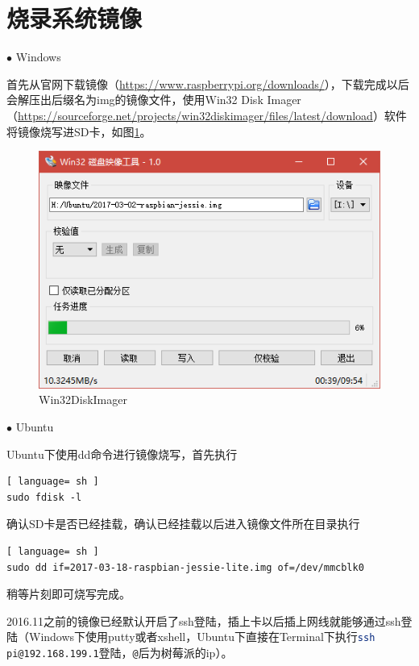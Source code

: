 	\section{烧录系统镜像}
		\par $\bullet$ Windows
		\par 首先从官网下载镜像（\href{https://www.raspberrypi.org/downloads/}{https://www.raspberrypi.org/downloads/}），下载完成以后会解压出后缀名为img的镜像文件，使用Win32 Disk Imager（\href{https://sourceforge.net/projects/win32diskimager/files/latest/download}{https://sourceforge.net/projects/win32diskimager/files/latest/download}）软件将镜像烧写进SD卡，如图\ref{fig:win32diskimager}。
		\begin{figure}[htp]
			\centering
			\includegraphics[width=13cm]{figures/win32diskimager.png}
			\caption{Win32DiskImager}
			\label{fig:win32diskimager}
		\end{figure}
		\par $\bullet$ Ubuntu
		\par Ubuntu下使用dd命令进行镜像烧写，首先执行
		\begin{lstlisting}[ language= sh ]
sudo fdisk -l
		\end{lstlisting}
		\par 确认SD卡是否已经挂载，确认已经挂载以后进入镜像文件所在目录执行
		\begin{lstlisting}[ language= sh ]
sudo dd if=2017-03-18-raspbian-jessie-lite.img of=/dev/mmcblk0
		\end{lstlisting}
		\par 稍等片刻即可烧写完成。
		\par 2016.11之前的镜像已经默认开启了ssh登陆，插上卡以后插上网线就能够通过ssh登陆（Windows下使用putty或者xshell，Ubuntu下直接在Terminal下执行\lstinline[language=sh]{ssh pi@192.168.199.1}登陆，\lstinline[language=sh]{@}后为树莓派的ip）。
